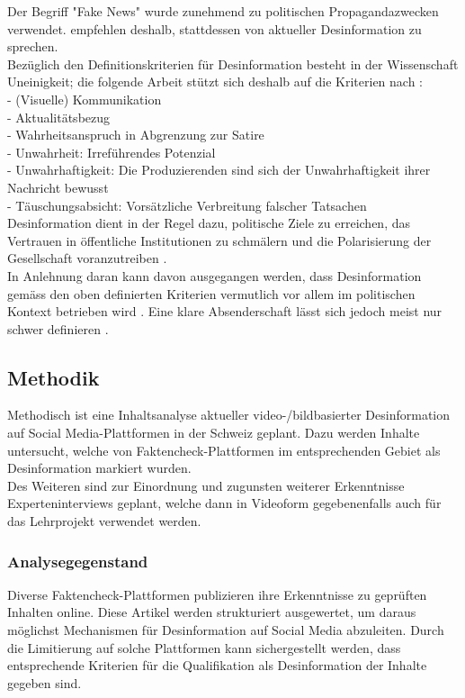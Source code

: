 \documentclass[12pt,a4paper]{article}        %
\begin{document}
Der Begriff "Fake News" wurde zunehmend zu politischen Propagandazwecken verwendet. \Textcite[148]{marx_fake_2020} empfehlen deshalb, stattdessen von aktueller Desinformation zu sprechen. \\
Bezüglich den Definitionskriterien für Desinformation besteht in der Wissenschaft Uneinigkeit; die folgende Arbeit stützt sich deshalb auf die Kriterien nach \textcite{marx_fake_2020}: \\
- (Visuelle) Kommunikation \\
- Aktualitätsbezug \\
- Wahrheitsanspruch in Abgrenzung zur Satire \\
- Unwahrheit: Irreführendes Potenzial \\
- Unwahrhaftigkeit: Die Produzierenden sind sich der Unwahrhaftigkeit ihrer Nachricht bewusst \\
- Täuschungsabsicht: Vorsätzliche Verbreitung falscher Tatsachen\\

Desinformation dient in der Regel dazu, politische Ziele zu erreichen, das Vertrauen in öffentliche Institutionen zu schmälern und die Polarisierung der Gesellschaft voranzutreiben \parencites[vgl.][ ]{allcott_social_2017}[225]{schmidt_meinungsbildung_2022}[162]{lange_unsicherheit_2019}. \\

In Anlehnung daran kann davon ausgegangen werden, dass Desinformation gemäss den oben definierten Kriterien vermutlich vor allem im politischen Kontext betrieben wird \parencites[vgl.][51]{sammer_fake_2021}[217]{allcott_social_2017}[498]{behnke_manipulation_2018}. Eine klare Absenderschaft lässt sich jedoch meist nur schwer definieren \parencite[498-499]{behnke_manipulation_2018}.

\subsection{Methodik}
Methodisch ist eine Inhaltsanalyse aktueller video-/bildbasierter Desinformation auf Social Media-Plattformen in der Schweiz geplant. Dazu werden Inhalte untersucht, welche von Faktencheck-Plattformen im entsprechenden Gebiet als Desinformation markiert wurden. \\
Des Weiteren sind zur Einordnung und zugunsten weiterer Erkenntnisse Experteninterviews geplant, welche dann in Videoform gegebenenfalls auch für das Lehrprojekt verwendet werden.

\subsubsection{Analysegegenstand}
Diverse Faktencheck-Plattformen publizieren ihre Erkenntnisse zu geprüften Inhalten online. Diese Artikel werden strukturiert ausgewertet, um daraus möglichst Mechanismen für Desinformation auf Social Media abzuleiten. Durch die Limitierung auf solche Plattformen kann sichergestellt werden, dass entsprechende Kriterien für die Qualifikation als Desinformation der Inhalte gegeben sind.
\end{document}
